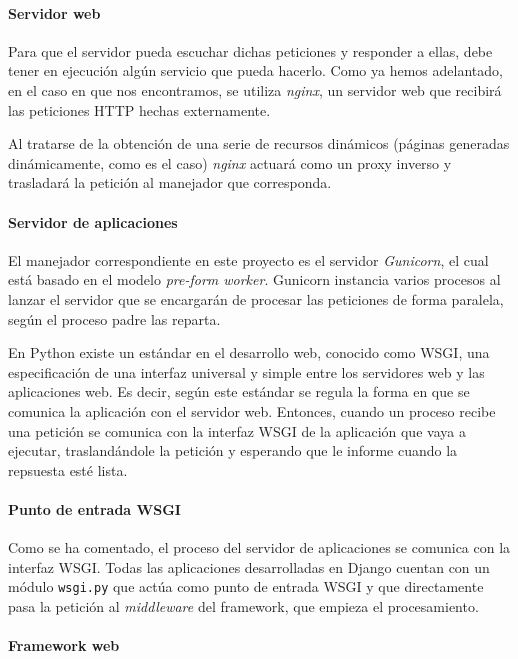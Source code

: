 \paragraph{Servidor web}

Para que el servidor pueda escuchar dichas peticiones y responder a ellas, debe
tener en ejecución algún servicio que pueda hacerlo. Como ya hemos adelantado,
en el caso en que nos encontramos, se utiliza \textit{nginx}, un servidor web
que recibirá las peticiones HTTP hechas externamente.

Al tratarse de la obtención de una serie de recursos dinámicos (páginas generadas
dinámicamente, como es el caso) \textit{nginx} actuará como un proxy inverso y trasladará
la petición al manejador que corresponda.

\paragraph{Servidor de aplicaciones}

El manejador correspondiente en este proyecto es el servidor \textit{Gunicorn},
el cual está basado en el modelo \textit{pre-form worker}. Gunicorn instancia
varios procesos al lanzar el servidor que se encargarán de procesar las
peticiones de forma paralela, según el proceso padre las reparta.

En Python existe un estándar en el desarrollo web, conocido como \ac{WSGI}, una
especificación de una interfaz universal y simple entre los servidores web y
las aplicaciones web. Es decir, según este estándar se regula la forma en que
se comunica la aplicación con el servidor web. Entonces, cuando un proceso
recibe una petición se comunica con la interfaz WSGI de la aplicación que vaya
a ejecutar, traslandándole la petición y esperando que le informe cuando la
repsuesta esté lista.

\paragraph{Punto de entrada WSGI}

Como se ha comentado, el proceso del servidor de aplicaciones se comunica con la
interfaz WSGI. Todas las aplicaciones desarrolladas en Django cuentan con un
módulo \texttt{wsgi.py} que actúa como punto de entrada WSGI y que directamente
pasa la petición al \textit{middleware} del framework, que empieza el
procesamiento.

\paragraph{Framework web}

